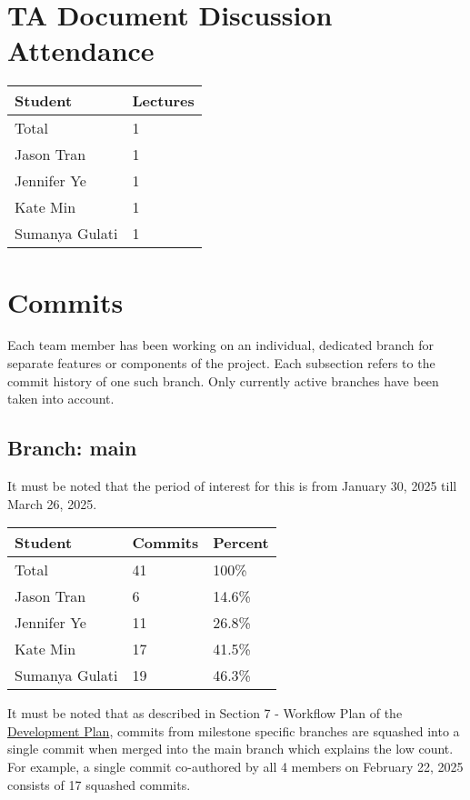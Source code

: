 \documentclass{article}
\begin{document}
\section{TA Document Discussion Attendance}

\begin{table}[H]
\centering
\begin{tabular}{ll}
\toprule
\textbf{Student} & \textbf{Lectures}\\
\midrule
Total & 1\\
Jason Tran & 1\\
Jennifer Ye & 1\\
Kate Min & 1\\
Sumanya Gulati & 1\\
\bottomrule
\end{tabular}
\end{table}

\section{Commits}
Each team member has been working on an individual, dedicated branch for
separate features or components of the project. Each subsection refers to the
commit history of one such branch. Only currently active branches have been
taken into account.

\subsection{Branch: main}
It must be noted that the period of interest for this is from January 30, 2025 till 
March 26, 2025.

\begin{table}[H]
\centering
\begin{tabular}{lll}
\toprule
\textbf{Student} & \textbf{Commits} & \textbf{Percent}\\
\midrule
Total & 41 & 100\% \\
Jason Tran & 6 & 14.6\% \\
Jennifer Ye & 11 & 26.8\% \\
Kate Min & 17 & 41.5\% \\
Sumanya Gulati & 19 & 46.3\% \\
\bottomrule
\end{tabular}
\end{table}

It must be noted that as described in Section 7 - Workflow Plan of the
\href{https://github.com/SumanyaG/Alkalytics/blob/main/docs/DevelopmentPlan/DevelopmentPlan.pdf}{Development Plan},
commits from milestone specific branches are squashed into a single
commit when merged into the main branch which explains the low count. For
example, a single commit co-authored by all 4 members on February 22, 2025 consists of 
17 squashed commits. 
\end{document}

